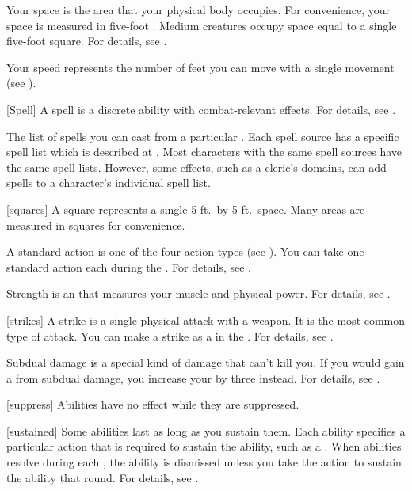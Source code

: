  Your space is the area that your physical body occupies.
For convenience, your space is measured in five-foot .
Medium creatures occupy space equal to a single five-foot square.
For details, see .

 Your speed represents the number of feet you can move with a single movement (see ).

[Spell] A spell is a discrete \magical ability with combat-relevant effects.
For details, see .

 The list of spells you can cast from a particular .
Each spell source has a specific spell list which is described at .
Most characters with the same spell sources have the same spell lists.
However, some effects, such as a cleric's domains, can add spells to a character's individual spell list.

[squares] A square represents a single 5-ft.\ by 5-ft.\ space.
Many areas are measured in squares for convenience.

 A standard action is one of the four action types (see ).
You can take one standard action each  during the .
For details, see .

 Strength is an  that measures your muscle and physical power.
For details, see .

[strikes] A strike is a single physical attack with a weapon.
It is the most common type of attack.
You can make a strike as a  in the .
For details, see .

 Subdual damage is a special kind of damage that can't kill you.
If you would gain a  from subdual damage, you increase your  by three instead.
For details, see .

[suppress] Abilities have no effect while they are suppressed.

[sustained] Some abilities last as long as you sustain them.
Each ability specifies a particular action that is required to sustain the ability, such as a .
When  abilities resolve during each , the ability is dismissed unless you take the action to sustain the ability that round.
For details, see .

